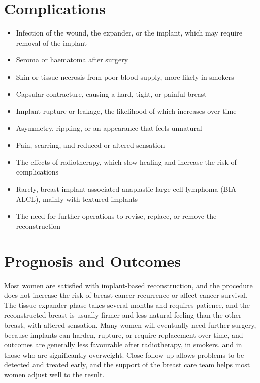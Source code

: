 \section*{Complications}
\begin{itemize}
    \item Infection of the wound, the expander, or the implant, which may require removal of the implant
    \item Seroma or haematoma after surgery
    \item Skin or tissue necrosis from poor blood supply, more likely in smokers
    \item Capsular contracture, causing a hard, tight, or painful breast
    \item Implant rupture or leakage, the likelihood of which increases over time
    \item Asymmetry, rippling, or an appearance that feels unnatural
    \item Pain, scarring, and reduced or altered sensation
    \item The effects of radiotherapy, which slow healing and increase the risk of complications
    \item Rarely, breast implant-associated anaplastic large cell lymphoma (BIA-ALCL), mainly with textured implants
    \item The need for further operations to revise, replace, or remove the reconstruction
\end{itemize}

\section*{Prognosis and Outcomes}
Most women are satisfied with implant-based reconstruction, and the procedure does not increase the risk of breast cancer recurrence or affect cancer survival. The tissue expander phase takes several months and requires patience, and the reconstructed breast is usually firmer and less natural-feeling than the other breast, with altered sensation. Many women will eventually need further surgery, because implants can harden, rupture, or require replacement over time, and outcomes are generally less favourable after radiotherapy, in smokers, and in those who are significantly overweight. Close follow-up allows problems to be detected and treated early, and the support of the breast care team helps most women adjust well to the result.

